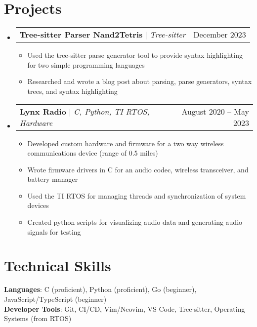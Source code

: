 \documentclass[letterpaper,11pt]{article}
\makeatletter
\newcommand{\resumeItem}[1]{
  \item\small{
    {#1 \vspace{-2pt}}
  }
}
\newcommand{\resumeProjectHeading}[2]{
    \item
    \begin{tabular*}{0.97\textwidth}{l@{\extracolsep{\fill}}r}
      \small#1 & #2 \\
    \end{tabular*}\vspace{-7pt}
}
\newcommand{\resumeSubHeadingListStart}{\begin{itemize}[leftmargin=0.15in, label={}]}
\newcommand{\resumeSubHeadingListEnd}{\end{itemize}}
\newcommand{\resumeItemListStart}{\begin{itemize}}
\newcommand{\resumeItemListEnd}{\end{itemize}\vspace{-5pt}}
\makeatother
\begin{document}
\section{Projects}
    \resumeSubHeadingListStart
      \resumeProjectHeading
          {\textbf{Tree-sitter Parser Nand2Tetris} $|$ \emph{Tree-sitter}}{December 2023}
          \resumeItemListStart
            \resumeItem{Used the tree-sitter parse generator tool to provide syntax highlighting for two simple programming languages}
            \resumeItem{Researched and wrote a blog post about parsing, parse generators, syntax trees, and syntax highlighting}
          \resumeItemListEnd
      \resumeProjectHeading
          {\textbf{Lynx Radio} $|$ \emph{C, Python, TI RTOS, Hardware}}{August 2020 -- May 2023}
          \resumeItemListStart
            \resumeItem{Developed custom hardware and firmware for a two way wireless communications device (range of 0.5 miles)}
            \resumeItem{Wrote firmware drivers in C for an audio codec, wireless transceiver, and battery manager}
            \resumeItem{Used the TI RTOS for managing threads and synchronization of system devices}
            \resumeItem{Created python scripts for visualizing audio data and generating audio signals for testing}
          \resumeItemListEnd
    \resumeSubHeadingListEnd

\section{Technical Skills}
 \begin{itemize}[leftmargin=0.15in, label={}]
    \small{\item{
     \textbf{Languages}{: C (proficient), Python (proficient), Go (beginner), JavaScript/TypeScript (beginner)} \\
     \textbf{Developer Tools}{: Git, CI/CD, Vim/Neovim, VS Code, Tree-sitter, Operating Systems (from RTOS)} \\
    }}
 \end{itemize}


\end{document}
